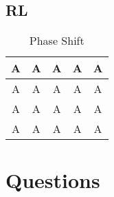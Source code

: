 \documentclass{article}
\begin{document}
		\subsection{RL}
			\begin{table}[htbp]
	\centering
	\caption{Phase Shift}
	\begin{tabular}{ccccc}
		\hline
		A & A & A & A & A \\ \hline
		A & A & A & A & A \\
		A & A & A & A & A \\
		A & A & A & A & A \\ \hline
	\end{tabular}
\end{table}

		
	\section{}

	\section{Questions}

	\section{}
	\section{}
\end{document}

